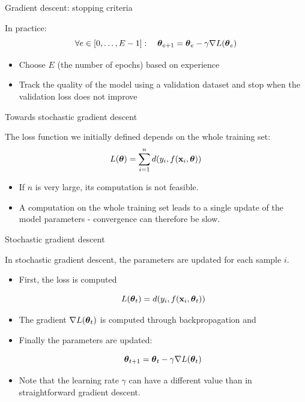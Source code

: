 \documentclass[xcolor=pdftex,dvipsnames,table,mathserif]{beamer}
\begin{document}
\begin{frame}{Gradient descent: stopping criteria}

  In practice:
  \[
  \forall e \in [0, \ldots, E-1]:\quad \boldsymbol{\theta}_{e+1} = \boldsymbol{\theta}_e - \gamma \nabla L(\boldsymbol{\theta}_e)
  \]

\begin{itemize}
\item Choose $E$ (the number of \alert{epochs}) based on experience
\item Track the quality of the model using a validation dataset and stop when the validation loss does not improve
\end{itemize}


\end{frame}
\begin{frame}{Towards stochastic gradient descent}

  The loss function we initially defined depends on the whole training set:
  \[
  L(\boldsymbol{\theta}) = \sum\limits_{i=1}^n d(y_i, f(\mathbf{x}_i, \boldsymbol{\theta}))
  \]

\pause

  \begin{itemize}[<+->]
  \item If $n$ is very large, its computation is not feasible.
  \item A computation on the whole training set leads to a single update of the model parameters - convergence can therefore be slow.
  \end{itemize}

\end{frame}

\begin{frame}{Stochastic gradient descent}

  In \alert{stochastic gradient descent}, the parameters are updated for each sample $i$.

\begin{itemize}[<+->]
\item
  First, the loss is computed

  \[
  L(\boldsymbol{\theta}_t) = d(y_i, f(\mathbf{x}_i, \boldsymbol{\theta}_t))
  \]
\item
  The gradient $\nabla L(\boldsymbol{\theta}_t)$ is computed through backpropagation and
\item Finally the parameters are updated:

  \[
    \boldsymbol{\theta}_{t+1} = \boldsymbol{\theta}_t - \gamma\nabla L(\boldsymbol{\theta}_t)
    \]
  \item
    Note that the learning rate $\gamma$ can have a different value than in straightforward gradient descent.
\end{itemize}




\end{frame}
\end{document}
